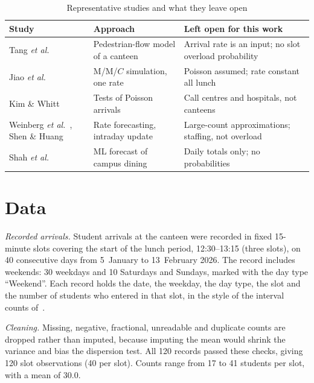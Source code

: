 \documentclass[conference,a4paper]{IEEEtran}
\begin{document}
\begin{table}[t]
\caption{Representative studies and what they leave open}\label{tab:gaps}
\centering\footnotesize
\begin{tabular}{@{}>{\raggedright\arraybackslash}p{}>{\raggedright\arraybackslash}p{}>{\raggedright\arraybackslash}p{}@{}}
\toprule
Study & Approach & Left open for this work \\
\midrule
Tang \textit{et al.}~\cite{tang2019a} & Pedestrian-flow model of a canteen & Arrival rate is an input; no slot overload probability \\
Jiao \textit{et al.}~\cite{jiao2022} & M/M/$C$ simulation, one rate & Poisson assumed; rate constant all lunch \\
Kim \& Whitt~\cite{kim2014} & Tests of Poisson arrivals & Call centres and hospitals, not canteens \\
Weinberg \textit{et al.}~\cite{weinberg2007}, Shen \& Huang~\cite{shen2008} & Rate forecasting, intraday update & Large-count approximations; staffing, not overload \\
Shah \textit{et al.}~\cite{shah2025} & ML forecast of campus dining & Daily totals only; no probabilities \\
\bottomrule
\end{tabular}
\end{table}

\section{Data}\label{sec:data}
\textit{Recorded arrivals.} Student arrivals at the canteen were recorded in fixed 15-minute slots covering the start
of the lunch period, 12:30--13:15 (three slots), on 40 consecutive days from 5~January to 13~February 2026. The record
includes weekends: 30 weekdays and 10 Saturdays and Sundays, marked with the day type ``Weekend''. Each record holds the
date, the weekday, the day type, the slot and the number of students who entered in that slot, in the style of the
interval counts of~\cite{tang2019a}.

\textit{Cleaning.} Missing, negative, fractional, unreadable and duplicate counts are dropped rather than imputed,
because imputing the mean would shrink the variance and bias the dispersion test. All 120 records passed these checks,
giving 120 slot observations (40 per slot). Counts range from 17 to 41 students per slot, with a mean of 30.0.
\end{document}
